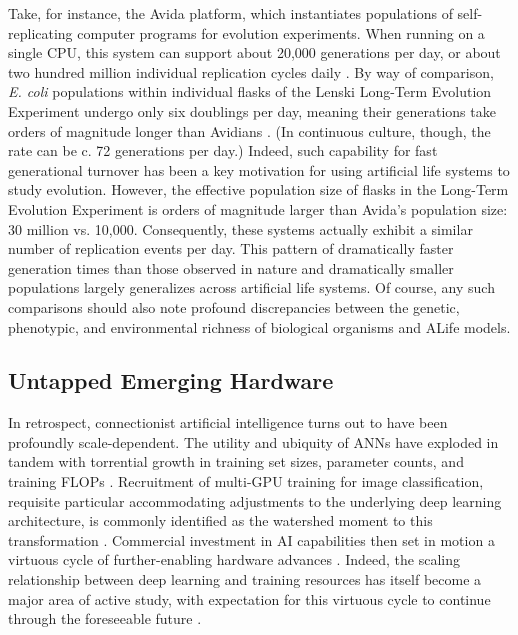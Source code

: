 Take, for instance, the Avida platform, which instantiates populations of self-replicating computer programs for evolution experiments.
When running on a single CPU, this system can support about 20,000 generations per day, or about two hundred million individual replication cycles daily \citep{ofria2009artificial}.
By way of comparison, \textit{E. coli} populations within individual flasks of the Lenski Long-Term Evolution Experiment undergo only six doublings per day, meaning their generations take orders of magnitude longer than Avidians \citep{good2017dynamics}.
(In continuous culture, though, the rate can be c. 72 generations per day.)
Indeed, such capability for fast generational turnover has been a key motivation for using artificial life systems to study evolution.
However, the effective population size of flasks in the Long-Term Evolution Experiment is orders of magnitude larger than Avida's population size: 30 million vs. 10,000.
Consequently, these systems actually exhibit a similar number of replication events per day.
This pattern of dramatically faster generation times than those observed in nature and dramatically smaller populations largely generalizes across artificial life systems.
Of course, any such comparisons should also note profound discrepancies between the genetic, phenotypic, and environmental richness of biological organisms and ALife models.


\subsection{Untapped Emerging Hardware}

In retrospect, connectionist artificial intelligence turns out to have been profoundly scale-dependent.
The utility and ubiquity of ANNs have exploded in tandem with torrential growth in training set sizes, parameter counts, and training FLOPs \citep{marcus2018deep}.
Recruitment of multi-GPU training for image classification, requisite particular accommodating adjustments to the underlying deep learning architecture, is commonly identified as the watershed moment to this transformation
 \citep{krizhevsky2012imagenet}.
Commercial investment in AI capabilities then set in motion a virtuous cycle of further-enabling hardware advances \citep{jouppi2017datacenter}.
Indeed, the scaling relationship between deep learning and training resources has itself become a major area of active study, with expectation for this virtuous cycle to continue through the foreseeable future \citep{kaplan2020scaling}.

